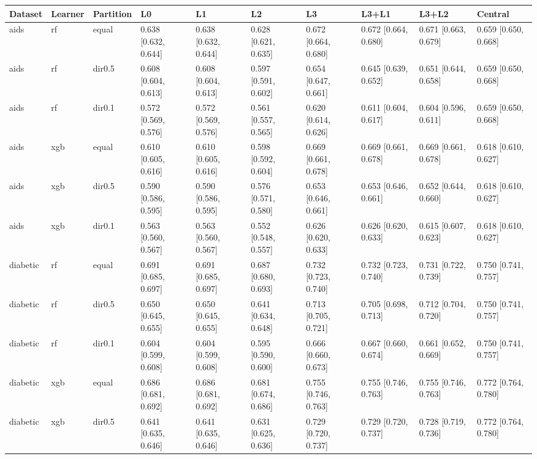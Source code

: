 \begin{tabular}{llllllllll}
\toprule
Dataset & Learner & Partition & L0 & L1 & L2 & L3 & L3+L1 & L3+L2 & Central \\
\midrule
aids & rf & equal & 0.638 [0.632, 0.644] & 0.638 [0.632, 0.644] & 0.628 [0.621, 0.635] & 0.672 [0.664, 0.680] & 0.672 [0.664, 0.680] & 0.671 [0.663, 0.679] & 0.659 [0.650, 0.668] \\
aids & rf & dir0.5 & 0.608 [0.604, 0.613] & 0.608 [0.604, 0.613] & 0.597 [0.591, 0.602] & 0.654 [0.647, 0.661] & 0.645 [0.639, 0.652] & 0.651 [0.644, 0.658] & 0.659 [0.650, 0.668] \\
aids & rf & dir0.1 & 0.572 [0.569, 0.576] & 0.572 [0.569, 0.576] & 0.561 [0.557, 0.565] & 0.620 [0.614, 0.626] & 0.611 [0.604, 0.617] & 0.604 [0.596, 0.611] & 0.659 [0.650, 0.668] \\
aids & xgb & equal & 0.610 [0.605, 0.616] & 0.610 [0.605, 0.616] & 0.598 [0.592, 0.604] & 0.669 [0.661, 0.678] & 0.669 [0.661, 0.678] & 0.669 [0.661, 0.678] & 0.618 [0.610, 0.627] \\
aids & xgb & dir0.5 & 0.590 [0.586, 0.595] & 0.590 [0.586, 0.595] & 0.576 [0.571, 0.580] & 0.653 [0.646, 0.661] & 0.653 [0.646, 0.661] & 0.652 [0.644, 0.660] & 0.618 [0.610, 0.627] \\
aids & xgb & dir0.1 & 0.563 [0.560, 0.567] & 0.563 [0.560, 0.567] & 0.552 [0.548, 0.557] & 0.626 [0.620, 0.633] & 0.626 [0.620, 0.633] & 0.615 [0.607, 0.623] & 0.618 [0.610, 0.627] \\
\addlinespace
diabetic & rf & equal & 0.691 [0.685, 0.697] & 0.691 [0.685, 0.697] & 0.687 [0.680, 0.693] & 0.732 [0.723, 0.740] & 0.732 [0.723, 0.740] & 0.731 [0.722, 0.739] & 0.750 [0.741, 0.757] \\
diabetic & rf & dir0.5 & 0.650 [0.645, 0.655] & 0.650 [0.645, 0.655] & 0.641 [0.634, 0.648] & 0.713 [0.705, 0.721] & 0.705 [0.698, 0.713] & 0.712 [0.704, 0.720] & 0.750 [0.741, 0.757] \\
diabetic & rf & dir0.1 & 0.604 [0.599, 0.608] & 0.604 [0.599, 0.608] & 0.595 [0.590, 0.600] & 0.666 [0.660, 0.673] & 0.667 [0.660, 0.674] & 0.661 [0.652, 0.669] & 0.750 [0.741, 0.757] \\
diabetic & xgb & equal & 0.686 [0.681, 0.692] & 0.686 [0.681, 0.692] & 0.681 [0.674, 0.686] & 0.755 [0.746, 0.763] & 0.755 [0.746, 0.763] & 0.755 [0.746, 0.763] & 0.772 [0.764, 0.780] \\
diabetic & xgb & dir0.5 & 0.641 [0.635, 0.646] & 0.641 [0.635, 0.646] & 0.631 [0.625, 0.636] & 0.729 [0.720, 0.737] & 0.729 [0.720, 0.737] & 0.728 [0.719, 0.736] & 0.772 [0.764, 0.780] \\

\end{tabular}
